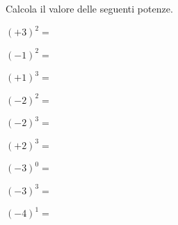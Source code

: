 \begin{esercizio}
\label{ese:2.22}
Calcola il valore delle seguenti potenze.

\vspace{-1em}
\begin{htmulticols}{3}
 \begin{enumeratees}
 \item \((+3)^2 =\)
 \item \((-1)^2 =\)
 \item \((+1)^3 =\)
 \item \((-2)^2 =\)
 \item \((-2)^3 =\)
 \item \((+2)^3 =\)
 \item \((-3)^0 =\)
 \item \((-3)^3 =\)
 \item \((-4)^1 =\)
 \end{enumeratees}
 \end{htmulticols}
\end{esercizio}

